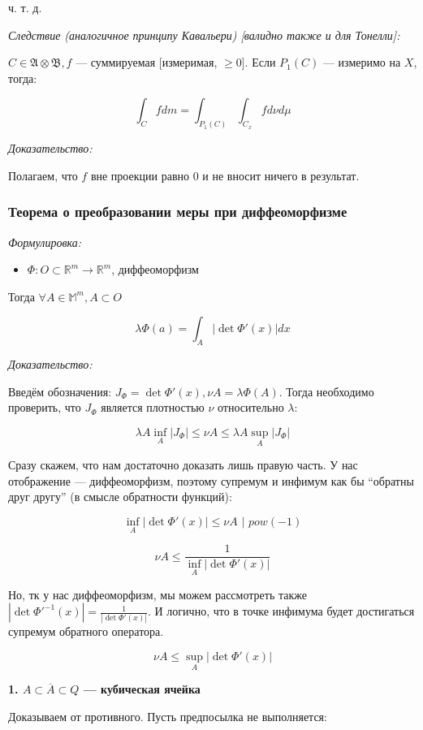 \documentclass{article}
\def\dbl{\,\,}
\begin{document}
ч. т. д. 

\textit{Следствие (аналогичное принципу Кавальери) [валидно также и для Тонелли]:}

$C \in \mathfrak{A} \otimes \mathfrak{B}, f$ --- суммируемая [измеримая, $\ge 0$]. Если $P_1(C)$ --- измеримо на $X$, тогда:

\[\int_{C} f dm = \int_{P_1(C)} \int_{C_x} fd\nu d\mu\]

\textit{Доказательство:}

Полагаем, что $f$ вне проекции равно 0 и не вносит ничего в результат.


\subsubsection{Теорема о преобразовании меры при диффеоморфизме}
\textit{Формулировка:}

\begin{itemize}
    \item $\Phi: O \subset \mathbb{R}^{m} \rightarrow \mathbb{R}^{m}$, диффеоморфизм
\end{itemize}

Тогда $\forall A \in \mathbb{M}^{m}, A \subset O$

\[\lambda \Phi(a) = \int_{A} |\det \Phi'(x)| dx\]

\textit{Доказательство:}

Введём обозначения: $J_\Phi = \det \Phi'(x), \nu A = \lambda \Phi(A)$. Тогда необходимо проверить, что $J_{\Phi}$ является плотностью $\nu$ относительно $\lambda$:

\[\lambda A \inf_{A} |J_{\Phi}| \le \nu A \le \lambda A\sup_{A} |J_{\Phi}|\]

Сразу скажем, что нам достаточно доказать лишь правую часть. У нас отображение --- диффеоморфизм, поэтому супремум и инфимум как бы ``обратны друг другу'' (в смысле обратности функций):

\[\inf_{A} |\det \Phi'(x)| \le \nu A \dbl | \dbl pow\left(-1\right)\]

\[\nu A \le \frac{1}{\inf_{A} |\det \Phi'(x)|}\]

Но, тк у нас диффеоморфизм, мы можем рассмотреть также $|\det \Phi'^{-1}(x)| = \frac{1}{|\det \Phi'(x)|}$. И логично, что в точке инфимума будет достигаться супремум обратного оператора.

\[\nu A \le\sup_{A} |\det \Phi'(x)|\]

\textbf{1. $A \subset \overline{A} \subset Q$  --- кубическая ячейка}

Доказываем от противного. Пусть предпосылка не выполняется:
\end{document}
